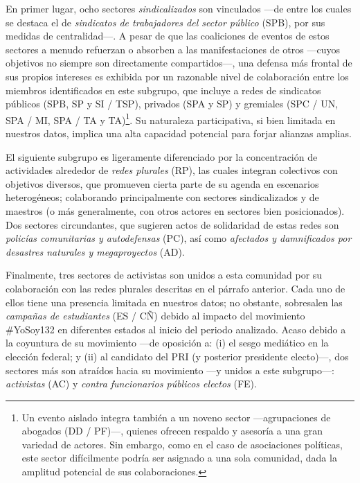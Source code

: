 \documentclass[letterpaper, 11pt]{book}
\theoremstyle{definition}
\theoremstyle{remark}
\begin{document}
En primer lugar, ocho sectores \emph{sindicalizados} son vinculados ---de entre los cuales se destaca el de \emph{sindicatos de trabajadores del sector público} (SPB), por sus medidas de centralidad---. 
A pesar de que las coaliciones de eventos de estos sectores a menudo refuerzan o absorben a las manifestaciones de otros ---cuyos objetivos no siempre son directamente compartidos---, una defensa más frontal de sus propios intereses es exhibida por un razonable nivel de colaboración entre los miembros identificados en este subgrupo, que incluye a redes de sindicatos públicos (SPB, SP y SI / TSP), privados (SPA y SP) y gremiales (SPC / UN, SPA / MI, SPA / TA y TA)\footnote{
    Un evento aislado integra también a un noveno sector ---agrupaciones de abogados (DD / PF)---, quienes ofrecen respaldo y asesoría a una gran variedad de actores. 
    Sin embargo, como en el caso de asociaciones políticas, este sector difícilmente podría ser asignado a una sola comunidad, dada la amplitud potencial de sus colaboraciones. 
}. 
Su naturaleza participativa, si bien limitada en nuestros datos, implica una alta capacidad potencial para forjar alianzas amplias. 


El siguiente subgrupo es ligeramente diferenciado por la concentración de actividades alrededor de \emph{redes plurales} (RP), las cuales integran colectivos con objetivos diversos, que promueven cierta parte de su agenda en escenarios heterogéneos; colaborando principalmente con sectores sindicalizados y de maestros (o más generalmente, con otros actores en sectores bien posicionados). 
Dos sectores circundantes, que sugieren actos de solidaridad de estas redes son \emph{policías comunitarias y autodefensas} (PC), así como \emph{afectados y damnificados por desastres naturales y megaproyectos} (AD). 


Finalmente, tres sectores de activistas son unidos a esta comunidad por su colaboración con las redes plurales descritas en el párrafo anterior. 
Cada uno de ellos tiene una presencia limitada en nuestros datos; no obstante, sobresalen las \emph{campañas de estudiantes} (ES / CÑ) debido al impacto del movimiento  \#YoSoy132 en diferentes estados al inicio del periodo analizado. 
Acaso debido a la coyuntura de su movimiento ---de oposición a: (i) el sesgo mediático en la elección federal; y (ii) al candidato del PRI (y posterior presidente electo)---, dos sectores más son atraídos hacia su movimiento ---y unidos a este subgrupo---: \emph{activistas} (AC) y \emph{contra funcionarios públicos electos} (FE). 
\end{document}
